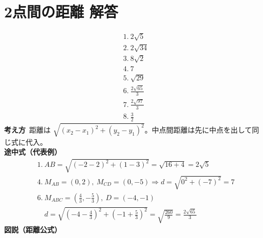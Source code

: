 \documentclass[paper=b4j,landscape,twocolumn,fleqn]{jlreq}
\begin{document}
\section{2点間の距離 解答}
\begin{align*}
&1.\ 2\sqrt{5}\\
&2.\ 2\sqrt{34}\\
&3.\ 8\sqrt{2}\\
&4.\ 7\\
&5.\ \sqrt{29}\\
&6.\ \frac{2\sqrt{65}}{3}\\
&7.\ \frac{2\sqrt{97}}{3}\\
&8.\ \frac{3}{2}
\end{align*}
\textbf{考え方}\
距離は $\sqrt{(x_2-x_1)^2+(y_2-y_1)^2}$。中点間距離は先に中点を出して同じ式に代入。\\
\textbf{途中式（代表例）}
\begin{align*}
&1.\ AB=\sqrt{(-2-2)^2+(1-3)^2}=\sqrt{16+4}=2\sqrt5\\
&4.\ M_{AB}=(0,2),\ M_{CD}=(0,-5)\Rightarrow d=\sqrt{0^2+(-7)^2}=7\\
&6.\ M_{ABC}=\left(\frac43,-\frac53\right),\ D=(-4,-1)\\
&\quad d=\sqrt{\left(-4-\frac43\right)^2+\left(-1+\frac53\right)^2}=\sqrt{\frac{260}{9}}=\frac{2\sqrt{65}}{3}
\end{align*}
\textbf{図説（距離公式）}
\begin{center}
\end{center}

\newpage
\end{document}
